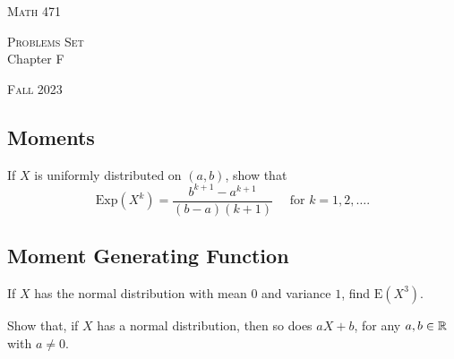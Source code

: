 


\hrulefill

\begin{minipage}{0.33\textwidth}
\textsc{Math 471}
\end{minipage} \hfill 
\begin{minipage}{0.32\textwidth}
\centering
\textsc{Problems Set} \\
Chapter F
\end{minipage}
 \hfill 
 \begin{minipage}{0.33\textwidth}
 \flushright \textsc{Fall 2023}
 \end{minipage}

\hrulefill

\setcounter{section}{6}

\subsection{Moments}

\begin{problem}
If $X$ is uniformly distributed on $(a, b)$, show that
    \[
        \mathrm{Exp} (X^k) = \frac{b^{k + 1} - a^{k + 1}}{(b - a) (k + 1)} \quad \text{ for } k = 1, 2, \ldots .
    \]
\end{problem}

\subsection{Moment Generating Function}

\begin{problem}
If $X$ has the normal distribution with mean $0$ and variance $1$, find $\mathrm{E} (X^3)$. 
\end{problem}

\begin{problem}
Show that, if $X$ has a normal distribution, then so does $aX + b$, for any $a, b \in \mathbb{R}$ with $a \neq 0$.
\end{problem}


